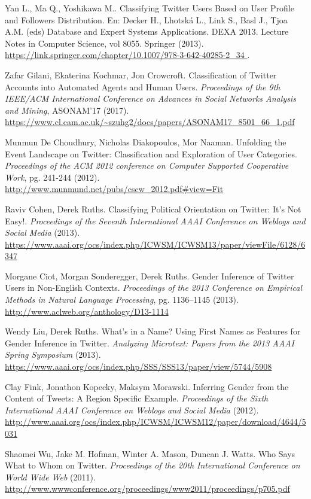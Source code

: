 \begin{thebibliography}{3}
 Yan L., Ma Q., Yoshikawa M.. Classifying Twitter Users Based on User Profile and Followers Distribution. En: Decker H., Lhotská L., Link S., Basl J., Tjoa A.M. (eds) Database and Expert Systems Applications. DEXA 2013. Lecture Notes in Computer Science, vol 8055. Springer (2013).
\url{https://link.springer.com/chapter/10.1007/978-3-642-40285-2_34 }.

 Zafar Gilani, Ekaterina Kochmar, Jon Crowcroft. Classification 
of Twitter Accounts into Automated Agents and Human Users.
{\em Proceedings of the 9th IEEE/ACM International Conference on Advances in 
Social Networks Analysis and Mining}, ASONAM'17 (2017).
\url{https://www.cl.cam.ac.uk/~szuhg2/docs/papers/ASONAM17_8501_66_1.pdf }

 Munmun De Choudhury, Nicholas Diakopoulos,
Mor Naaman. Unfolding the Event Landscape on Twitter:
Classification and Exploration of User Categories. 
{\em Proceedings of the ACM 2012 conference on Computer Supported Cooperative 
Work}, pg. 241-244 (2012).
\url{http://www.munmund.net/pubs/cscw_2012.pdf#view=Fit }

 Raviv Cohen, Derek Ruths. Classifying Political Orientation on Twitter: 
It’s Not Easy!. {\em Proceedings of the Seventh International AAAI Conference on Weblogs and 
Social Media} (2013).
\url{ https://www.aaai.org/ocs/index.php/ICWSM/ICWSM13/paper/viewFile/6128/6347   }


 Morgane Ciot, Morgan Sonderegger, Derek Ruths. 
Gender Inference of Twitter Users in Non-English Contexts.
{\em Proceedings of the 2013 Conference on Empirical Methods in Natural Language Processing},
pg. 1136–1145 (2013).
\url{ http://www.aclweb.org/anthology/D13-1114 }

 Wendy Liu, Derek Ruths. What’s in a Name? Using First Names as Features 
for Gender Inference in Twitter.
{\em Analyzing Microtext: Papers from the 2013 AAAI Spring Symposium} (2013).
\url{ https://www.aaai.org/ocs/index.php/SSS/SSS13/paper/view/5744/5908 }

 Clay Fink, Jonathon Kopecky, Maksym Morawski. Inferring Gender from 
the Content of Tweets: A Region Specific Example.
{\em Proceedings of the Sixth International AAAI Conference on Weblogs and Social Media} (2012).
\url{ http://www.aaai.org/ocs/index.php/ICWSM/ICWSM12/paper/download/4644/5031 }

 Shaomei Wu, Jake M. Hofman, Winter A. Mason, Duncan J. Watts.  
Who Says What to Whom on Twitter.
{\em  Proceedings of the 20th International Conference on World Wide Web} (2011).
\url{ http://www.wwwconference.org/proceedings/www2011/proceedings/p705.pdf }


\end{thebibliography}
